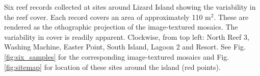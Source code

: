 \label{fig:reef_record_example_bathy} Six reef records collected at sites around Lizard Island showing the variability in the reef cover. Each record covers an area of approximately 110 m$^2$. These are rendered as the othographic projection of the image-textured mosaics. The variability in cover is readily apparent. Clockwise, from top left: North Reef 3, Washing Machine, Easter Point, South Island, Lagoon 2 and Resort. See Fig. \ref{fig:six_samples} for the corresponding image-textured mosaics and Fig. \ref{fig:sitemap} for location of these sites around the island (red points).